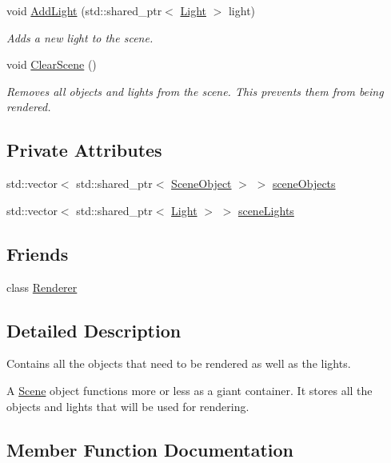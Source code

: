 \begin{DoxyCompactItemize}
void \hyperlink{class_scene_ab9b1a906b16bf867600fc3f5b734c1d4}{Add\+Light} (std\+::shared\+\_\+ptr$<$ \hyperlink{class_light}{Light} $>$ light)
\begin{DoxyCompactList}\small\item\em Adds a new light to the scene. \end{DoxyCompactList}\item
void \hyperlink{class_scene_ac3b0f6126be07f78a61abfac3487e4df}{Clear\+Scene} ()
\begin{DoxyCompactList}\small\item\em Removes all objects and lights from the scene. This prevents them from being rendered. \end{DoxyCompactList}\end{DoxyCompactItemize}
\subsection*{Private Attributes}
\begin{DoxyCompactItemize}
\item
std\+::vector$<$ std\+::shared\+\_\+ptr$<$ \hyperlink{class_scene_object}{Scene\+Object} $>$ $>$ \hyperlink{class_scene_a871382922b2a04d7883cf6d34529b5df}{scene\+Objects}
\item
std\+::vector$<$ std\+::shared\+\_\+ptr$<$ \hyperlink{class_light}{Light} $>$ $>$ \hyperlink{class_scene_a847f4f9c485a56b084a1340811f0e726}{scene\+Lights}
\end{DoxyCompactItemize}
\subsection*{Friends}
\begin{DoxyCompactItemize}
\item
class \hyperlink{class_scene_a70538530bc36e033e360880ef311df61}{Renderer}
\end{DoxyCompactItemize}


\subsection{Detailed Description}
Contains all the objects that need to be rendered as well as the lights.

A \hyperlink{class_scene}{Scene} object functions more or less as a giant container. It stores all the objects and lights that will be used for rendering.

\subsection{Member Function Documentation}
\hypertarget{class_scene_ab9b1a906b16bf867600fc3f5b734c1d4}{}\label{class_scene_ab9b1a906b16bf867600fc3f5b734c1d4}
